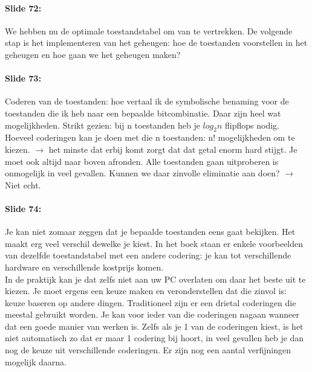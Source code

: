\documentclass[10pt,a4paper]{book}
\begin{document}
\paragraph{Slide 72:} We hebben nu de optimale toestandstabel om van te vertrekken. De volgende stap is het implementeren van het geheugen: hoe de toestanden voorstellen in het geheugen en hoe gaan we het geheugen maken?

\paragraph{Slide 73:} Coderen van de toestanden: hoe vertaal ik de symbolische benaming voor de toestanden die ik heb naar een bepaalde bitcombinatie. Daar zijn heel wat mogelijkheden. Strikt gezien: bij n toestanden heb je $log_2n$ flipflops nodig. Hoeveel coderingen kan je doen met die n toestanden: n! mogelijkheden om te kiezen. $\rightarrow$ het minste dat erbij komt zorgt dat dat getal enorm hard stijgt. Je moet ook altijd naar boven afronden. Alle toestanden gaan uitproberen is onmogelijk in veel gevallen. Kunnen we daar zinvolle eliminatie aan doen? $\rightarrow$ Niet echt.

\paragraph{Slide 74:} Je kan niet zomaar zeggen dat je bepaalde toestanden eens gaat bekijken. Het maakt erg veel verschil dewelke je kiest. In het boek staan er enkele voorbeelden van dezelfde toestandstabel met een andere codering: je kan tot verschillende hardware en verschillende kostprijs komen.\\
In de praktijk kan je dat zelfs niet aan uw PC overlaten om daar het beste uit te kiezen. Je moet ergens een keuze maken en veronderstellen dat die zinvol is: keuze baseren op andere dingen. Traditioneel zijn er een drietal coderingen die meestal gebruikt worden. Je kan voor ieder van die coderingen nagaan wanneer dat een goede manier van werken is. Zelfs als je 1 van de coderingen kiest, is het niet automatisch zo dat er maar 1 codering bij hoort, in veel gevallen heb je dan nog de keuze uit verschillende coderingen. Er zijn nog een aantal verfijningen mogelijk daarna.
\end{document}
